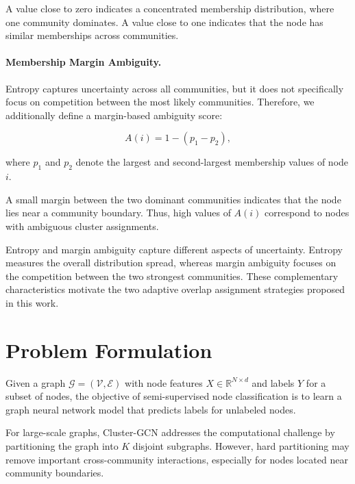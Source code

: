\documentclass[a4paper,11pt,oneside,onecolumn,preprint]{elsarticle}
\numberwithin{equation}{section}
\begin{document}
A value close to zero indicates a concentrated membership distribution, where one community dominates.
A value close to one indicates that the node has similar memberships across communities.

\paragraph{Membership Margin Ambiguity.}

Entropy captures uncertainty across all communities, but it does not specifically focus on competition between the most likely communities.
Therefore, we additionally define a margin-based ambiguity score:

\begin{equation}
A(i)=1-(p_1-p_2),
\label{eq:ambiguity}
\end{equation}

where $p_1$ and $p_2$ denote the largest and second-largest membership values of node $i$.

A small margin between the two dominant communities indicates that the node lies near a community boundary.
Thus, high values of $A(i)$ correspond to nodes with ambiguous cluster assignments.

Entropy and margin ambiguity capture different aspects of uncertainty.
Entropy measures the overall distribution spread, whereas margin ambiguity focuses on the competition between the two strongest communities.
These complementary characteristics motivate the two adaptive overlap assignment strategies proposed in this work.

\section{Problem Formulation}
\label{sec:problem}

Given a graph
$\mathcal{G}=(\mathcal{V},\mathcal{E})$
with node features
$X\in\mathbb{R}^{N\times d}$
and labels
$Y$ for a subset of nodes, the objective of semi-supervised node classification is to learn a graph neural network model that predicts labels for unlabeled nodes.

For large-scale graphs, Cluster-GCN addresses the computational challenge by partitioning the graph into $K$ disjoint subgraphs.
However, hard partitioning may remove important cross-community interactions, especially for nodes located near community boundaries.
\end{document}
